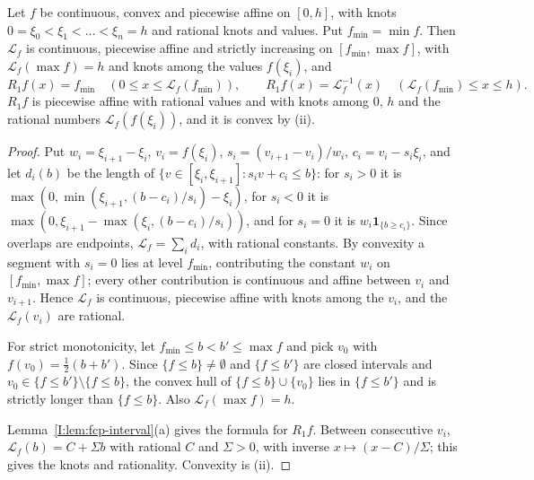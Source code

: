 \begin{lemma}\label{lem:fcp-distribution}
Let $f$ be continuous, convex and piecewise affine on $[0,h]$, with knots $0=\xi_0<\xi_1<\dots<\xi_n=h$ and rational
knots and values. Put $f_{\min}=\min f$. Then $\mathcal L_f$ is continuous, piecewise affine and strictly increasing on
$[f_{\min},\max f]$, with $\mathcal L_f(\max f)=h$ and knots among the values $f(\xi_i)$, and
\[
 R_1f(x)=f_{\min}\quad(0\le x\le\mathcal L_f(f_{\min})),\qquad R_1f(x)=\mathcal L_f^{-1}(x)\quad(\mathcal L_f(f_{\min})\le x\le h).
\]
$R_1f$ is piecewise affine with rational values and with knots among $0$, $h$ and the rational numbers
$\mathcal L_f(f(\xi_i))$, and it is convex by (ii).
\end{lemma}

\begin{proof}
Put $w_i=\xi_{i+1}-\xi_i$, $v_i=f(\xi_i)$, $s_i=(v_{i+1}-v_i)/w_i$, $c_i=v_i-s_i\xi_i$, and let $d_i(b)$ be the length of $\{v\in[\xi_i,\xi_{i+1}]:s_iv+c_i\le b\}$: for $s_i>0$ it is $\max(0,\min(\xi_{i+1},(b-c_i)/s_i)-\xi_i)$, for $s_i<0$ it is $\max(0,\xi_{i+1}-\max(\xi_i,(b-c_i)/s_i))$, and for $s_i=0$ it is $w_i\mathbf1_{\{b\ge c_i\}}$. Since overlaps are endpoints, $\mathcal L_f=\sum_id_i$, with rational constants. By convexity a segment with $s_i=0$ lies at level $f_{\min}$, contributing the constant $w_i$ on $[f_{\min},\max f]$; every other contribution is continuous and affine between $v_i$ and $v_{i+1}$. Hence $\mathcal L_f$ is continuous, piecewise affine with knots among the $v_i$, and the $\mathcal L_f(v_i)$ are rational.

For strict monotonicity, let $f_{\min}\le b<b'\le\max f$ and pick $v_0$ with $f(v_0)=\frac12(b+b')$. Since $\{f\le b\}\ne\emptyset$ and $\{f\le b'\}$ are closed intervals and $v_0\in\{f\le b'\}\setminus\{f\le b\}$, the convex hull of $\{f\le b\}\cup\{v_0\}$ lies in $\{f\le b'\}$ and is strictly longer than $\{f\le b\}$. Also $\mathcal L_f(\max f)=h$.

Lemma~\ref{I:lem:fcp-interval}(a) gives the formula for $R_1f$. Between consecutive $v_i$, $\mathcal L_f(b)=C+\Sigma b$ with rational $C$ and $\Sigma>0$, with inverse $x\mapsto(x-C)/\Sigma$; this gives the knots and rationality. Convexity is (ii).
\end{proof}

